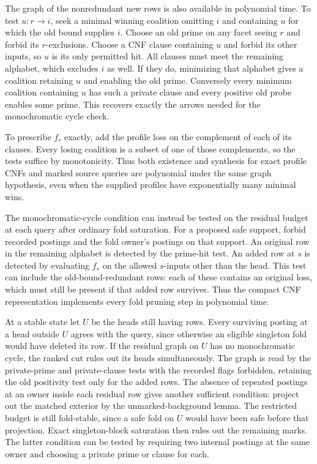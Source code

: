 The graph of the nonredundant new rows is also
available in polynomial time. To test $u:r\to i$,
seek a minimal winning coalition omitting $i$ and
containing $u$ for which the old bound supplies $i$.
Choose an old prime on any facet seeing $r$ and
forbid its $r$-exclusions. Choose a CNF clause
containing $u$ and forbid its other inputs, so $u$
is its only permitted hit. All clauses must meet
the remaining alphabet, which excludes $i$ as well.
If they do, minimizing that alphabet gives a
coalition retaining $u$ and enabling the old prime.
Conversely every minimum coalition containing $u$
has such a private clause and every positive old
probe enables some prime. This recovers exactly the
arrows needed for the monochromatic cycle check.

To prescribe $f_r$ exactly, add the profile loss
on the complement of each of its clauses. Every
losing coalition is a subset of one of those
complements, so the tests suffice by monotonicity.
Thus both existence and synthesis for exact profile
CNFs and marked source queries are polynomial under
the same graph hypothesis, even when the supplied
profiles have exponentially many minimal wins.

The monochromatic-cycle condition can instead be tested
on the residual budget at each query after ordinary fold
saturation. For a proposed safe support, forbid recorded
postings and the fold owner's postings on that support.
An original row in the remaining alphabet is detected by
the prime-hit test. An added row at $s$ is detected by
evaluating $f_s$ on the allowed $s$-inputs other than the
head. This test can include the old-bound-redundant rows:
each of these contains an original loss, which must still
be present if that added row survives. Thus the compact
CNF representation implements every fold pruning step
in polynomial time.

At a stable state let $U$ be the heads still having
rows. Every surviving posting at a head outside $U$
agrees with the query, since otherwise an eligible
singleton fold would have deleted its row. If the
residual graph on $U$ has no monochromatic cycle,
the ranked cut rules out its heads simultaneously.
The graph is read by the private-prime and private-clause
tests with the recorded flags forbidden, retaining the
old positivity test only for the added rows. The absence
of repeated postings at an owner inside each residual
row gives another sufficient condition: project out the
matched exterior by the unmarked-background lemma.
The restricted budget is still fold-stable, since a safe
fold on $U$ would have been safe before that projection.
Exact singleton-block saturation then rules out the
remaining marks. The latter condition can be tested by
requiring two internal postings at the same owner and
choosing a private prime or clause for each.

